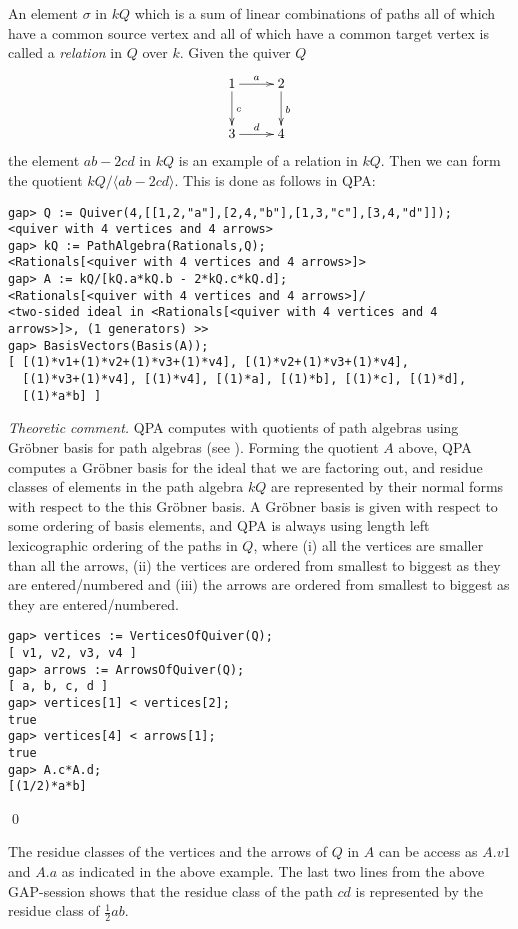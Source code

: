 \documentclass{amsart}
\theoremstyle{definition}
\theoremstyle{theoretic}
\newenvironment{theocomm}
{\medskip\footnotesize\textit{Theoretic comment.} }
{\qed\par\medskip}
\begin{document}
An element $\sigma$ in $kQ$ which is a sum of linear combinations of
paths all of which have a common source vertex and all of which have a
common target vertex is called a \emph{relation} in $Q$ over $k$.
Given the quiver $Q$
\[\xymatrix{
1\ar[r]^a\ar[d]^c & 2\ar[d]^b\\
3\ar[r]^d & 4
}\]
the element $ab - 2cd$ in $kQ$ is an example of a relation in $kQ$.
Then we can form the quotient $kQ/\langle ab - 2 cd\rangle$.  This is
done as follows in QPA:
\begin{verbatim}
gap> Q := Quiver(4,[[1,2,"a"],[2,4,"b"],[1,3,"c"],[3,4,"d"]]);
<quiver with 4 vertices and 4 arrows>
gap> kQ := PathAlgebra(Rationals,Q);
<Rationals[<quiver with 4 vertices and 4 arrows>]>
gap> A := kQ/[kQ.a*kQ.b - 2*kQ.c*kQ.d];
<Rationals[<quiver with 4 vertices and 4 arrows>]/
<two-sided ideal in <Rationals[<quiver with 4 vertices and 4
arrows>]>, (1 generators) >>
gap> BasisVectors(Basis(A));
[ [(1)*v1+(1)*v2+(1)*v3+(1)*v4], [(1)*v2+(1)*v3+(1)*v4], 
  [(1)*v3+(1)*v4], [(1)*v4], [(1)*a], [(1)*b], [(1)*c], [(1)*d], 
  [(1)*a*b] ]
\end{verbatim}
\begin{theocomm}
QPA computes with quotients of path algebras using Gr\"obner basis for
path algebras (see \cite{Green}).  Forming the quotient $A$ above, QPA
computes a Gr\"obner basis for the ideal that we are factoring out,
and residue classes of elements in the path algebra $kQ$ are
represented by their normal forms with respect to the this Gr\"obner
basis.  A Gr\"obner basis is given with respect to some ordering of
basis elements, and QPA is always using length left lexicographic
ordering of the paths in $Q$, where (i) all the vertices are smaller
than all the arrows, (ii) the vertices are ordered from smallest to
biggest as they are entered/numbered and (iii) the arrows are ordered
from smallest to biggest as they are entered/numbered.
\begin{verbatim}
gap> vertices := VerticesOfQuiver(Q);
[ v1, v2, v3, v4 ]
gap> arrows := ArrowsOfQuiver(Q);    
[ a, b, c, d ]
gap> vertices[1] < vertices[2];
true
gap> vertices[4] < arrows[1];
true
gap> A.c*A.d;
[(1/2)*a*b]
\end{verbatim}
\end{theocomm}

The residue classes of the vertices and the arrows of $Q$ in $A$ can
be access as $A.v1$ and $A.a$ as indicated in the above example.  The
last two lines from the above GAP-session shows that the residue class
of the path $cd$ is represented by the residue class of
$\frac{1}{2}ab$. 
\end{document}
